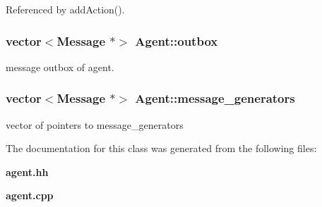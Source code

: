 Referenced by addAction().
\subsubsection[outbox]{\setlength{\rightskip}{0pt plus 5cm}vector$<${\bf Message} $\ast$$>$ {\bf Agent::outbox}\hspace{0.3cm}{\tt  [protected]}}\label{classAgent_19f662675103367161c5601cb2f0b138}


message outbox of agent. 

\subsubsection[message\_\-generators]{\setlength{\rightskip}{0pt plus 5cm}vector$<${\bf Message} $\ast$$>$ {\bf Agent::message\_\-generators}\hspace{0.3cm}{\tt  [protected]}}\label{classAgent_0f56f3d9e2749729e54df11802a572c4}


vector of pointers to message\_\-generators 



The documentation for this class was generated from the following files:\begin{CompactItemize}
\item 
{\bf agent.hh}\item 
{\bf agent.cpp}\end{CompactItemize}
